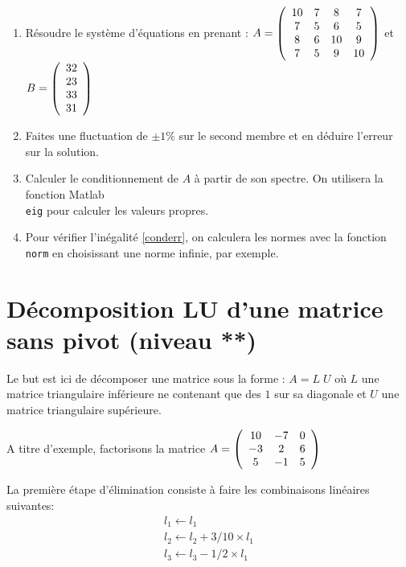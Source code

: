 \documentclass[a4paper, 10pt]{article}
\begin{document}
  \begin{enumerate} 
 \item Résoudre le système d'équations en prenant :
 $A=\left(
\begin{array}{c c c c}
10  & 7   &   8 & 7  \\
7  &  5   & 6 & 5   \\
8  &  6  &  10   & 9  \\
7 & 5  & 9  &  10  
\end{array}
\right)$
et $B=\left(
\begin{array}{c c c c}
32  \\
23   \\
33  \\
31 
\end{array}
\right)$ 
 \item Faites une fluctuation de $\pm 1\%$ sur le second membre et en déduire l'erreur
 sur la solution. 
 \item Calculer le conditionnement de $A$ à partir de son spectre. On utilisera la
 fonction Matlab \\ {\tt eig} pour calculer les valeurs propres.
 \item Pour vérifier l'inégalité \eqref{conderr},  on calculera les normes avec la fonction
 {\tt  norm} en choisissant une norme infinie, par exemple.
 \end{enumerate}
 
\section{Décomposition LU d'une matrice sans pivot (niveau **)}

Le but est ici de décomposer une matrice sous la forme : $A=L\; U$
où 
$L$ une matrice triangulaire inférieure ne contenant que des $1$ sur sa diagonale et 
$U$ une matrice triangulaire supérieure.

A titre d'exemple, factorisons la matrice
 $A=\left(
\begin{array}{c c c}
10  & -7   &  0  \\
-3  &  2   & 6   \\
 5  &  -1  &  5  
\end{array}
\right)$

La première étape d'élimination consiste à faire les combinaisons linéaires suivantes: 
 \begin{equation}
 \begin{array}{c}
 l_1 \leftarrow l_1 \\
   l_2 \leftarrow l_2 +3/10 \times l_1   \\ l_3 \leftarrow l_3 -1/2 \times l_1  \\ 
\end{array}
\end{equation}
\end{document}
